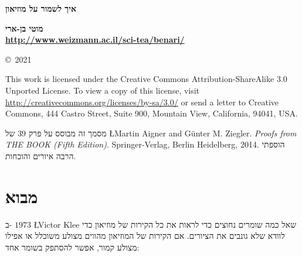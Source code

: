 \documentclass[12pt,a4paper]{article}
\begin{document}
\thispagestyle{empty}
\begin{center}
\textbf{\LARGE איך לשמור על מוזיאון}

\bigskip

\textbf{\Large מוטי בן-ארי\\\bigskip\bigskip\normalsize\url{http://www.weizmann.ac.il/sci-tea/benari/}}


\medskip
\end{center}

\begin{footnotesize}
\begin{center}
\copyright{}\  2021 
\end{center}

\medskip

This work is licensed under the Creative Commons Attribution-ShareAlike 3.0 Unported License. To view a copy of this license, visit \url{http://creativecommons.org/licenses/by-sa/3.0/} or send a letter to Creative Commons, 444 Castro Street, Suite 900, Mountain View, California, 94041, USA.

\end{footnotesize}

\bigskip
\bigskip


מסמך זה מבוסס על פרק
$39$
של
\L{Martin Aigner and Günter M. Ziegler. \textit{Proofs from THE BOOK (Fifth Edition)}. Springer-Verlag, Berlin Heidelberg, 2014.}
הוספתי הרבה איורים והוכחות.

\section{מבוא}
ב-%
$1973$
\L{Victor Klee}
שאל כמה שומרים נחוצים כדי לראות את כל הקירות של מוזיאון כדי לוודא שלא גונבים את הציורים. אם הקירות של המוזיאון מהווים מצולע משוכלל או אפילו מצולע קמור, אפשר להסתפק בשומר אחד:
\begin{center}
\end{center}
\end{document}
